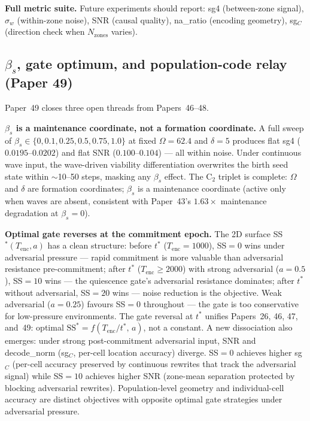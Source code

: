 \documentclass[11pt]{article}
\begin{document}
\textbf{Full metric suite.}  Future experiments should report:
sg4 (between-zone signal), $\sigma_w$ (within-zone noise),
SNR (causal quality), na\_ratio (encoding geometry),
sg$_C$ (direction check when $N_\mathrm{zones}$ varies).

\subsection{$\beta_s$, gate optimum, and population-code relay (Paper 49)}

Paper~49 closes three open threads from Papers~46--48.

\textbf{$\beta_s$ is a maintenance coordinate, not a formation coordinate.}
A full sweep of $\beta_s \in \{0, 0.1, 0.25, 0.5, 0.75, 1.0\}$ at fixed
$\Omega=62.4$ and $\delta=5$ produces flat sg4 ($0.0195$--$0.0202$) and flat
SNR ($0.100$--$0.104$) --- all within noise.
Under continuous wave input, the wave-driven viability differentiation overwrites
the birth seed state within $\sim$10--50 steps, masking any $\beta_s$ effect.
The C$_2$ triplet is complete: $\Omega$ and $\delta$ are formation coordinates;
$\beta_s$ is a maintenance coordinate (active only when waves are absent,
consistent with Paper~43's $1.63\times$ maintenance degradation at $\beta_s=0$).

\textbf{Optimal gate reverses at the commitment epoch.}
The 2D surface SS$^*(T_\mathrm{enc}, a)$ has a clean structure:
before $t^*$ ($T_\mathrm{enc}=1000$), SS$=0$ wins under adversarial pressure
--- rapid commitment is more valuable than adversarial resistance pre-commitment;
after $t^*$ ($T_\mathrm{enc}\geq 2000$) with strong adversarial ($a=0.5$), SS$=10$
wins --- the quiescence gate's adversarial resistance dominates;
after $t^*$ without adversarial, SS$=20$ wins --- noise reduction is the objective.
Weak adversarial ($a=0.25$) favours SS$=0$ throughout --- the gate is too
conservative for low-pressure environments.
The gate reversal at $t^*$ unifies Papers~26, 46, 47, and~49:
optimal $\mathrm{SS}^* = f(T_\mathrm{enc}/t^*,\, a)$, not a constant.
A new dissociation also emerges: under strong post-commitment adversarial input,
SNR and decode\_norm (sg$_C$, per-cell location accuracy) diverge.
SS$=0$ achieves higher sg$_C$ (per-cell accuracy preserved by continuous rewrites
that track the adversarial signal) while SS$=10$ achieves higher SNR (zone-mean
separation protected by blocking adversarial rewrites).
Population-level geometry and individual-cell accuracy are distinct objectives
with opposite optimal gate strategies under adversarial pressure.
\end{document}
